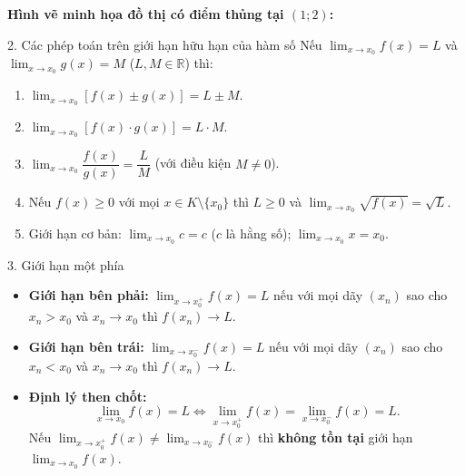 \documentclass[12pt, a4paper]{article}
\begin{document}
\noindent \textbf{Hình vẽ minh họa đồ thị có điểm thủng tại $(1; 2)$:}
\begin{center}
\end{center}

\begin{pedabox}{2. Các phép toán trên giới hạn hữu hạn của hàm số}
Nếu $\lim_{x \to x_0} f(x) = L$ và $\lim_{x \to x_0} g(x) = M$ ($L, M \in \mathbb{R}$) thì:
\begin{enumerate}[leftmargin=0.6cm]
    \item $\lim_{x \to x_0} [f(x) \pm g(x)] = L \pm M$.
    \item $\lim_{x \to x_0} [f(x) \cdot g(x)] = L \cdot M$.
    \item $\lim_{x \to x_0} \dfrac{f(x)}{g(x)} = \dfrac{L}{M}$ (với điều kiện $M \neq 0$).
    \item Nếu $f(x) \ge 0$ với mọi $x \in K \setminus \{x_0\}$ thì $L \ge 0$ và $\lim_{x \to x_0} \sqrt{f(x)} = \sqrt{L}$.
    \item Giới hạn cơ bản: $\lim_{x \to x_0} c = c$ ($c$ là hằng số); $\lim_{x \to x_0} x = x_0$.
\end{enumerate}
\end{pedabox}

\begin{pedabox}{3. Giới hạn một phía}
\begin{itemize}[leftmargin=0.6cm]
    \item \textbf{Giới hạn bên phải:} $\lim_{x \to x_0^+} f(x) = L$ nếu với mọi dãy $(x_n)$ sao cho $x_n > x_0$ và $x_n \to x_0$ thì $f(x_n) \to L$.
    \item \textbf{Giới hạn bên trái:} $\lim_{x \to x_0^-} f(x) = L$ nếu với mọi dãy $(x_n)$ sao cho $x_n < x_0$ và $x_n \to x_0$ thì $f(x_n) \to L$.
    \item \textbf{Định lý then chốt:}
    $$\lim_{x \to x_0} f(x) = L \iff \lim_{x \to x_0^+} f(x) = \lim_{x \to x_0^-} f(x) = L.$$
    Nếu $\lim_{x \to x_0^+} f(x) \neq \lim_{x \to x_0^-} f(x)$ thì \textbf{không tồn tại} giới hạn $\lim_{x \to x_0} f(x)$.
\end{itemize}
\end{pedabox}
\end{document}
